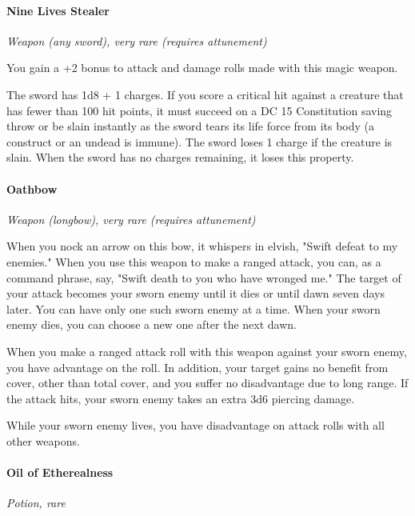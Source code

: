 \documentclass[
]{article}
\begin{document}
\hypertarget{nine-lives-stealer}{%
\paragraph{Nine Lives Stealer}\label{nine-lives-stealer}}

\emph{Weapon (any sword), very rare (requires attunement)}

You gain a +2 bonus to attack and damage rolls made with this magic
weapon.

The sword has 1d8 + 1 charges. If you score a critical hit against a
creature that has fewer than 100 hit points, it must succeed on a DC 15
Constitution saving throw or be slain instantly as the sword tears its
life force from its body (a construct or an undead is immune). The sword
loses 1 charge if the creature is slain. When the sword has no charges
remaining, it loses this property.

\hypertarget{oathbow}{%
\paragraph{Oathbow}\label{oathbow}}

\emph{Weapon (longbow), very rare (requires attunement)}

When you nock an arrow on this bow, it whispers in elvish, "Swift defeat
to my enemies." When you use this weapon to make a ranged attack, you
can, as a command phrase, say, "Swift death to you who have wronged me."
The target of your attack becomes your sworn enemy until it dies or
until dawn seven days later. You can have only one such sworn enemy at a
time. When your sworn enemy dies, you can choose a new one after the
next dawn.

When you make a ranged attack roll with this weapon against your sworn
enemy, you have advantage on the roll. In addition, your target gains no
benefit from cover, other than total cover, and you suffer no
disadvantage due to long range. If the attack hits, your sworn enemy
takes an extra 3d6 piercing damage.

While your sworn enemy lives, you have disadvantage on attack rolls with
all other weapons.

\hypertarget{oil-of-etherealness}{%
\paragraph{Oil of Etherealness}\label{oil-of-etherealness}}

\emph{Potion, rare}
\end{document}
